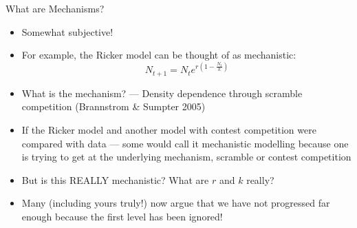 \documentclass[xcolor=x11names,handout,compress]{beamer}
\renewcommand{\(}{\begin{columns}}
\renewcommand{\)}{\end{columns}}
\newcommand{\<}[1]{\begin{column}{#1}}
\renewcommand{\>}{\end{column}}
\begin{document}
\begin{frame}{What are Mechanisms?}

   \begin{itemize}[<+->] \itemsep4pt{}
			\item Somewhat subjective! 
			\item For example, the Ricker model can be thought of as 
			mechanistic:
			\begin{equation} 
				N_{t+1} = N_t e^{r\left(1-\frac{N_t}{k}\right)} 
			\end{equation} 
				
			\item What is the mechanism? --- Density dependence through scramble competition 
			(Brannstrom \& Sumpter 2005)

			\item If the Ricker model and another model with contest 
			competition were compared with data --- some would call it mechanistic 
			modelling because one is trying to get at the underlying 
			mechanism, scramble or contest competition
			
			\item But is this REALLY mechanistic? What are $r$ and $k$ really?
	
			\item Many (including yours truly!) now argue that we have not 
			progressed far enough because the first level has been ignored!
   \end{itemize}

\end{frame}
\end{document}
